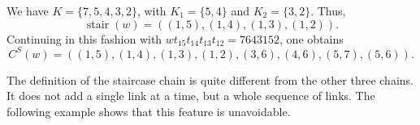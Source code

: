 \documentclass[ALCO]{cedram}
\DeclareMathOperator{\stair}{\mathrm{stair}}
\newcommand{\CS}{C^S}
\begin{document}
\begin{example}
\begin{center}
	\end{center}
	We have $K=\{7,5,4,3,2\}$, with $K_1=\{5,4\}$ and $K_2=\{3,2\}$. Thus,
	\[\stair(w) = ((1,5),(1,4),(1,3),(1,2)). \]
	Continuing in this fashion with $wt_{15}t_{14}t_{13}t_{12}=7643152$, one obtains
	\[\CS(w) = ((1,5),(1,4),(1,3),(1,2),(3,6),(4,6),(5,7),(5,6)).\]
\end{example}

The definition of the staircase chain is quite different from the other three chains. It does not add a single link at a time, but a whole sequence of links. The following example shows that this feature is unavoidable.
\end{document}
